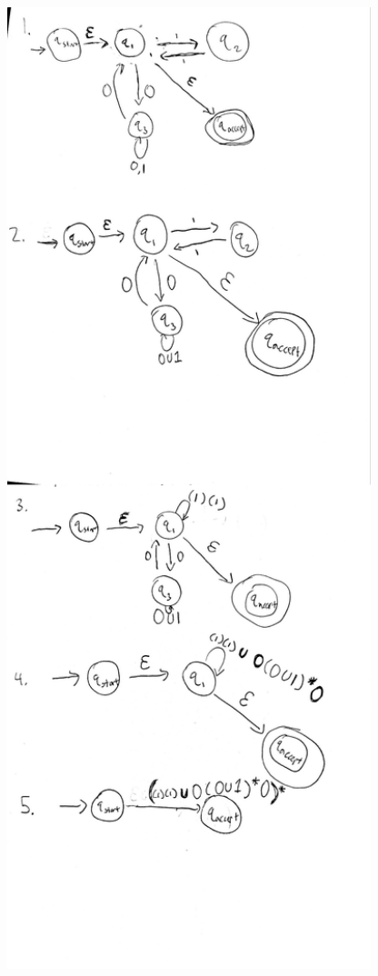 \documentclass[11pt]{article}
\theoremstyle{definition}
\theoremstyle{theorem}
\begin{document}
\includegraphics[width=15cm, height=28cm]{./p3_images/d1.jpg} \\
\end{document}

